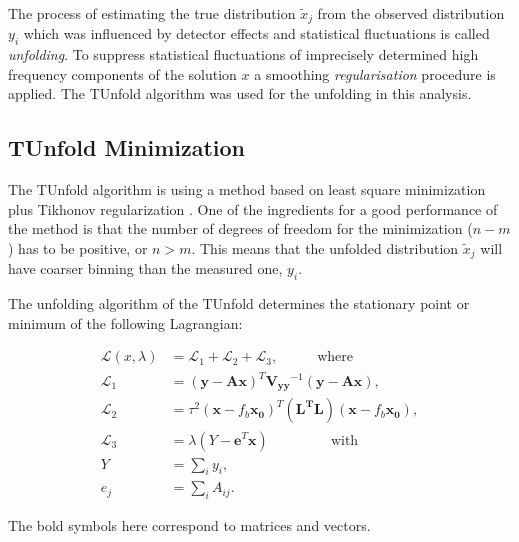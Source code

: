 The process of estimating the true distribution $\tilde{x}_{j}$ from the observed distribution $y_{i}$ which was influenced
by detector effects and statistical fluctuations is called \textit{unfolding}. To suppress statistical fluctuations of imprecisely
determined high frequency components of the solution $x$ a smoothing \textit{regularisation} procedure is applied. 
The TUnfold \cite{Schmitt:2012kp} algorithm was used for the unfolding in this analysis.

\subsection{TUnfold Minimization}\label{ssec:TUmini}

The TUnfold algorithm is using a method based on least square minimization plus Tikhonov regularization \cite{Tikhonov:1963}. One of the ingredients 
for a good performance of the method is that the number of degrees of freedom for the minimization ($n - m$) has to be positive,
or $n > m$. This means that the unfolded distribution $\tilde{x}_j$ will have coarser binning than the measured one, $y_{i}$.

The unfolding algorithm of the TUnfold determines the stationary point or minimum of the following Lagrangian:

\begin{align}
 \mathcal{L}(x, \lambda) & = \mathcal{L}_{1} + \mathcal{L}_{2} + \mathcal{L}_{3}, \;\;\;\;\;\;\;\;\;\; \textrm{where}\\
 \mathcal{L}_{1} & = (\mathbf{y} - \mathbf{A}\mathbf{x})^{T} \mathbf{V_{yy}}^{-1}(\mathbf{y} - \mathbf{A}\mathbf{x}),\\
 \mathcal{L}_{2} & = \tau^{2}(\mathbf{x} - f_{b}\mathbf{x_{0}})^{T} (\mathbf{L^{T}L}) (\mathbf{x} - f_{b}\mathbf{x_{0}}), \\
 \mathcal{L}_{3} & = \lambda(Y -\mathbf{e}^{T}\mathbf{x}) \;\;\;\;\;\;\;\;\;\;\;\;\;\;\;\; \textrm{with} \\
 Y & = \sum_{i} y_{i}, \\
 e_{j} & = \sum_{i} A_{ij}.
\end{align}

The bold symbols here correspond to matrices and vectors.

